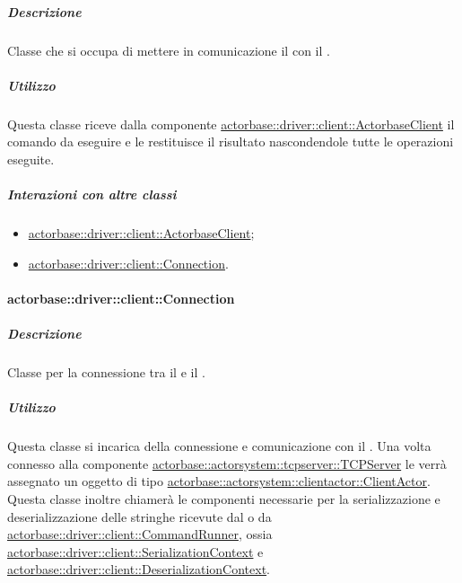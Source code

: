 \documentclass{scalatekids-article}
\begin{document}
\subparagraph{Descrizione}

Classe  che si occupa di mettere in comunicazione il
 con il .

\subparagraph{Utilizzo}

Questa classe riceve dalla componente \hyperref[sec:actorbase::driver::client::ActorbaseClient]{actorbase::driver::client::ActorbaseClient}
il comando da eseguire e le restituisce il risultato nascondendole
tutte le operazioni eseguite.

\subparagraph{Interazioni con altre classi}

\begin{itemize}
\item \hyperref[sec:actorbase::driver::client::ActorbaseClient]{actorbase::driver::client::ActorbaseClient};
\item \hyperref[sec:actorbase::driver::client::Connection]{actorbase::driver::client::Connection}.
\end{itemize}

\paragraph{actorbase::driver::client::Connection}
\label{sec:actorbase::driver::client::Connection}

\subparagraph{Descrizione}

Classe per la connessione tra il  e il .

\subparagraph{Utilizzo}

Questa classe si incarica della connessione e comunicazione con il . Una volta
connesso alla componente \hyperref[sec:actorbase::actorsystem::tcpserver::TCPServer]{actorbase::actorsystem::tcpserver::TCPServer}
le verrà assegnato un oggetto di tipo \hyperref[sec:actorbase::actorbase::actorsystem::clientactor::ClientActor]{actorbase::actorsystem::clientactor::ClientActor}.\\
Questa classe inoltre chiamerà le componenti necessarie per la serializzazione e deserializzazione
delle stringhe ricevute dal  o da \hyperref[sec:actorbase::driver::client::CommandRunner]{actorbase::driver::client::CommandRunner},
ossia \hyperref[sec:actorbase::driver::client::SerializationContext]{actorbase::driver::client::SerializationContext}
e \hyperref[sec:actorbase::driver::client::Deserializationtext]{actorbase::driver::client::DeserializationContext}.
\end{document}
